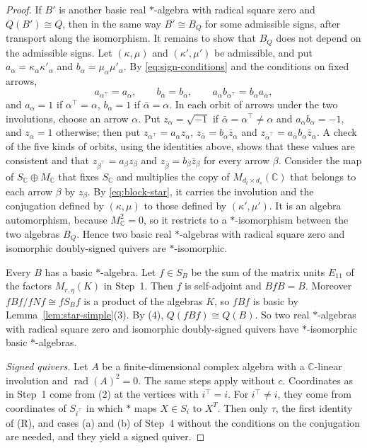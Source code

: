 \documentclass[12pt, a4paper]{report}
\theoremstyle{plain}
\theoremstyle{definition}
\theoremstyle{remark}
\theoremstyle{plain}
\newcommand{\rad}[0]{\operatorname{rad}} %
\newcommand{\CC}{\mathbb{C}}
\begin{document}
\begin{proof}
If $B'$ is another basic real $*$-algebra with radical square zero and $Q(B')\cong Q$, then in the same way $B'\cong B_Q$ for some admissible signs, after transport along the isomorphism. It remains to show that $B_Q$ does not depend on the admissible signs. Let $(\kappa,\mu)$ and $(\kappa',\mu')$ be admissible, and put $a_\alpha=\kappa_\alpha\kappa'_\alpha$ and $b_\alpha=\mu_\alpha\mu'_\alpha$. By \eqref{eq:sign-conditions} and the conditions on fixed arrows,
\[ a_{\alpha^{\top}}=a_\alpha,\qquad b_{\bar\alpha}=b_\alpha,\qquad a_\alpha b_{\alpha^{\top}}=b_\alpha a_{\bar\alpha}, \]
and $a_\alpha=1$ if $\alpha^{\top}=\alpha$, $b_\alpha=1$ if $\bar\alpha=\alpha$. In each orbit of arrows under the two involutions, choose an arrow $\alpha$. Put $z_\alpha=\sqrt{-1}$ if $\bar\alpha=\alpha^{\top}\neq\alpha$ and $a_\alpha b_\alpha=-1$, and $z_\alpha=1$ otherwise; then put $z_{\alpha^{\top}}=a_\alpha z_\alpha$, $z_{\bar\alpha}=b_\alpha\bar z_\alpha$ and $z_{\bar\alpha^{\top}}=a_{\bar\alpha}b_\alpha\bar z_\alpha$. A check of the five kinds of orbits, using the identities above, shows that these values are consistent and that $z_{\beta^{\top}}=a_\beta z_\beta$ and $z_{\bar\beta}=b_\beta\bar z_\beta$ for every arrow $\beta$. Consider the map of $S_\CC\oplus M_\CC$ that fixes $S_\CC$ and multiplies the copy of $M_{d_t\times d_s}(\CC)$ that belongs to each arrow $\beta$ by $z_\beta$. By \eqref{eq:block-star}, it carries the involution and the conjugation defined by $(\kappa,\mu)$ to those defined by $(\kappa',\mu')$. It is an algebra automorphism, because $M_\CC^2=0$, so it restricts to a $*$-isomorphism between the two algebras $B_Q$. Hence two basic real $*$-algebras with radical square zero and isomorphic doubly-signed quivers are $*$-isomorphic.

Every $B$ has a basic $*$-algebra. Let $f\in S_B$ be the sum of the matrix units $E_{11}$ of the factors $M_{r,\eta}(K)$ in Step~1. Then $f$ is self-adjoint and $BfB=B$. Moreover $fBf/fNf\cong fS_Bf$ is a product of the algebras $K$, so $fBf$ is basic by Lemma~\ref{lem:star-simple}(3). By (4), $Q(fBf)\cong Q(B)$. So two real $*$-algebras with radical square zero and isomorphic doubly-signed quivers have $*$-isomorphic basic $*$-algebras.

\emph{Signed quivers.} Let $A$ be a finite-dimensional complex algebra with a $\CC$-linear involution and $\rad(A)^2=0$. The same steps apply without $c$. Coordinates as in Step~1 come from (2) at the vertices with $i^{\top}=i$. For $i^{\top}\neq i$, they come from coordinates of $S_{i^{\top}}$ in which $*$ maps $X\in S_i$ to $X^T$. Then only $\tau$, the first identity of (R), and cases (a) and (b) of Step~4 without the conditions on the conjugation are needed, and they yield a signed quiver.
\end{proof}
\end{document}
